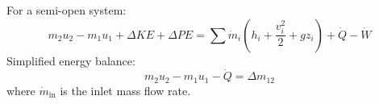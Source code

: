 For a semi-open system:  
\[
m_2 u_2 - m_1 u_1 + \Delta KE + \Delta PE = \sum \dot{m}_i \left( h_i + \frac{v_i^2}{2} + gz_i \right) + \dot{Q} - \dot{W}
\]  
Simplified energy balance:  
\[
m_2 u_2 - m_1 u_1 - \dot{Q} = \Delta m_{12}
\]  
where \( \dot{m}_{\text{in}} \) is the inlet mass flow rate.